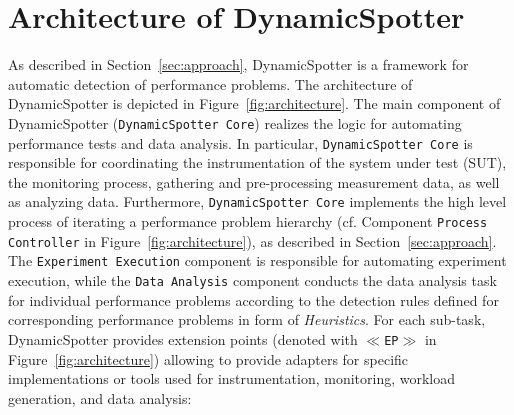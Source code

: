 \documentclass{report}
\newcommand{\DS}{DynamicSpotter }
\begin{document}
\newpage
\section{Architecture of \DS}
\label{sec:architecture}
As described in Section~\ref{sec:approach}, \DS is a framework for automatic detection of performance problems. The
architecture of \DS is depicted in Figure~\ref{fig:architecture}. The main component of \DS (\texttt{\DS Core}) realizes
the logic for automating performance tests and data analysis. In particular, \texttt{\DS Core} is responsible for
coordinating  the instrumentation of the system under test (SUT), the monitoring process, gathering and
pre-processing measurement data, as well as analyzing data. Furthermore, \texttt{\DS Core} implements the high level
process of iterating a performance problem hierarchy (cf. Component \texttt{Process Controller} in
Figure~\ref{fig:architecture}), as described in Section~\ref{sec:approach}.
The \texttt{Experiment Execution} component is responsible for automating experiment execution, while the \texttt{Data
Analysis} component conducts the data analysis task for individual performance problems according to the detection rules
defined for corresponding performance problems in form of \emph{Heuristics}.
For each sub-task, \DS provides extension points (denoted with \texttt{\(\ll\)EP\(\gg\)} in Figure~\ref{fig:architecture})
allowing to provide adapters for specific implementations or tools used for instrumentation, monitoring, workload
generation, and data analysis:
\end{document}
